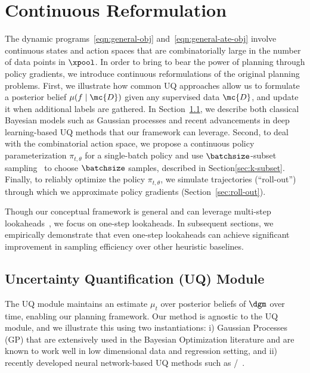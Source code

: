 \section{Continuous Reformulation}
\label{sec:methodology}

The dynamic programs~\eqref{eqn:general-obj} and~\eqref{eqn:general-ate-obj} involve
continuous states and action spaces
that are combinatorially large in the number of data points in $\xpool$. In order to bring to bear the power of planning through policy gradients, 
we introduce continuous reformulations of the original planning problems.
First, we illustrate how common UQ approaches allow us to formulate a posterior belief $\mu(f \mid \mc{D})$ given any supervised data $\mc{D}$,
and update it when additional labels are gathered. 
In Section~\ref{sec:uq}, we describe  both classical 
Bayesian models such as 
Gaussian processes and recent advancements in deep learning-based UQ  methods that our framework can leverage.
Second, to deal with the combinatorial action space,
we propose a continuous policy parameterization $\pi_{t,\theta}$  for a single-batch policy and use $\batchsize$-subset sampling~\citep{EfraimidisSp06} to choose
$\batchsize$ samples, described in  Section\ref{sec:k-subset}.
Finally, to reliably optimize the policy $\pi_{t,\theta}$,  we simulate trajectories (``roll-out'') through which we approximate policy gradients 
(Section~\ref{sec:roll-out}). 

Though our conceptual framework is general and can leverage multi-step 
lookaheads~\citep{BertsekasTs96,EfroniDaScMa18, EfroniGhMa20}, we focus on one-step lookaheads. In subsequent sections, we  empirically demonstrate that even one-step lookaheads can  achieve significant improvement in sampling efficiency over other heuristic baselines. 

\subsection{Uncertainty Quantification (UQ) Module}
\label{sec:uq}

The UQ module maintains an estimate $\mu_t$ over posterior beliefs of $\dgm$ over time, enabling our planning framework. Our method is agnostic to the UQ module, and
we illustrate this using two instantiations: i) Gaussian Processes (GP) that are extensively used in the Bayesian Optimization literature and are known to work well in low dimensional data and regression setting, and ii) recently developed neural network-based UQ methods such as  
\ensembles/\ensembleplus~\citep{OsbandWeAsDwLuIbLaHaDoRo22}. %

